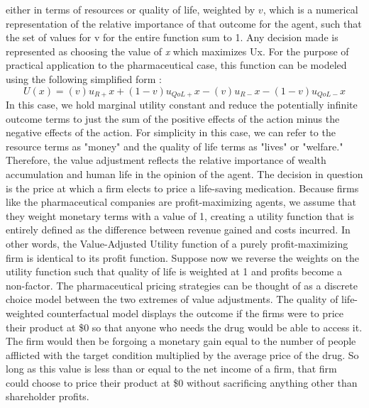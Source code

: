 \documentclass[12pt,english]{article} \usepackage{mathptmx}
\begin{document}
either in terms of resources or quality of life, weighted by $v$, which 
is a numerical representation of the relative importance of that outcome 
for the agent, such that the set of values for v for the entire function 
sum to 1. Any decision made is represented as choosing the value of 
\emph{x} which maximizes U{x}. For the purpose of practical application 
to the pharmaceutical case, this function can be modeled using the 
following simplified form \cite{mozaffar20}: \begin{equation} U(x) = 
(v)u_{R+}x + (1-v)u_{QoL+}x- (v)u_{R-}x - (1-v)u_{QoL-}x\end{equation} 
In this case, we hold marginal utility constant and reduce the 
potentially infinite outcome terms to just the sum of the positive 
effects of the action minus the negative effects of the action. For 
simplicity in this case, we can refer to the resource terms as "money" 
and the quality of life terms as "lives" or "welfare." Therefore, the 
value adjustment reflects the relative importance of wealth accumulation 
and human life in the opinion of the agent. The decision in question is 
the price at which a firm elects to price a life-saving medication. 
Because firms like the pharmaceutical companies are profit-maximizing 
agents, we assume that they weight monetary terms with a value of 1, 
creating a utility function that is entirely defined as the difference 
between revenue gained and costs incurred. In other words, the 
Value-Adjusted Utility function of a purely profit-maximizing firm is 
identical to its profit function. Suppose now we reverse the weights on 
the utility function such that quality of life is weighted at 1 and 
profits become a non-factor. The pharmaceutical pricing strategies can 
be thought of as a discrete choice model between the two extremes of 
value adjustments. The quality of life-weighted counterfactual model 
displays the outcome if the firms were to price their product at \$0 so 
that anyone who needs the drug would be able to access it. The firm 
would then be forgoing a monetary gain equal to the number of people 
afflicted with the target condition multiplied by the average price of 
the drug. So long as this value is less than or equal to the net income 
of a firm, that firm could choose to price their product at \$0 without 
sacrificing anything other than shareholder profits.
 
\end{document}

